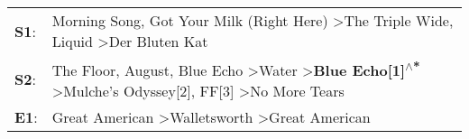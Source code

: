 \begin{supertabular}{p{0.03\textwidth}p{0.92\textwidth}}
 \textbf{S1}:  &                                                                                                                                        Morning Song\textsuperscript{}, \enspace Got Your Milk (Right Here)\textsuperscript{} \textgreater \enspace The Triple Wide\textsuperscript{}, \enspace Liquid\textsuperscript{} \textgreater \enspace Der Bluten Kat\textsuperscript{}  \enspace  \\
 \textbf{S2}:  &  The Floor\textsuperscript{}, \enspace August\textsuperscript{}, \enspace Blue Echo\textsuperscript{} \textgreater \enspace Water\textsuperscript{} \textgreater \enspace \textbf{Blue Echo[1]\textsuperscript{$\wedge$*}} \textgreater \enspace Mulche's Odyssey[2]\textsuperscript{}, \enspace FF[3]\textsuperscript{} \textgreater \enspace No More Tears\textsuperscript{}  \enspace  \\
 \textbf{E1}:  &                                                                                                                                                                                                                                   Great American\textsuperscript{} \textgreater \enspace Walletsworth\textsuperscript{} \textgreater \enspace Great American\textsuperscript{}  \enspace  \\
\end{supertabular}
